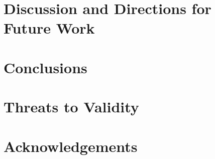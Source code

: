 \documentclass[sigconf]{acmart}
\begin{document}
\section{Discussion and Directions for Future Work}
\section{Conclusions}
\section*{Threats to Validity}
\section*{Acknowledgements}




\end{document}
